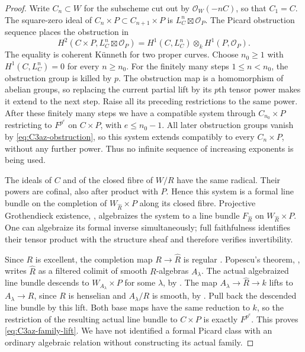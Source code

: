 \begin{proof}
Write $C_n\subset W$ for the subscheme cut out by
$\mathcal O_W(-nC)$, so that $C_1=C$. The square-zero ideal of
$C_n\times P\subset C_{n+1}\times P$ is
$L_C^n\boxtimes\mathcal O_P$. The Picard obstruction sequence
\citep[Lemma 37.4.1]{frC3azStacksPicThickening}
places the obstruction in
\begin{equation}\label{eq:C3az-obstruction}
 H^2(C\times P,L_C^n\boxtimes\mathcal O_P)
      =H^1(C,L_C^n)\otimes_k H^1(P,\mathcal O_P).
\end{equation}
The equality is coherent K\"unneth for two proper curves. Choose
$n_0\ge1$ with $H^1(C,L_C^n)=0$ for every $n\ge n_0$.
For the finitely many steps $1\le n<n_0$, the obstruction group
is killed by $p$. The obstruction map is a homomorphism of abelian
groups, so replacing the current partial lift by its $p$th tensor
power makes it extend to the next step. Raise all its preceding
restrictions to the same power. After these finitely many steps
we have a compatible system through $C_{n_0}\times P$ restricting
to $F^{p^e}$ on $C\times P$, with $e\le n_0-1$.
All later obstruction groups vanish by \eqref{eq:C3az-obstruction},
so this system extends compatibly to every $C_n\times P$, without
any further power. Thus no infinite sequence of increasing exponents
is being used.

The ideals of $C$ and of the closed fibre of $W/R$ have the same
radical. Their powers are cofinal, also after product with $P$.
Hence this system is a formal line bundle on the completion of
$W_{\widehat R}\times P$ along its closed fibre. Projective
Grothendieck existence,
\citet[Lemma 30.24.3]{frC3azStacksExistence}, algebraizes the system
to a line bundle $F_{\widehat R}$ on $W_{\widehat R}\times P$.
One can algebraize its formal inverse simultaneously; full
faithfulness identifies their tensor product with the structure
sheaf and therefore verifies invertibility.

Since $R$ is excellent, the completion map $R\to\widehat R$ is
regular \citep[Lemma 15.51.14]{frC3azStacksCompletion}. Popescu's theorem,
\citet[Theorem 16.12.1]{frC3azStacksPopescu}, writes $\widehat R$
as a filtered colimit of smooth $R$-algebras $A_\lambda$.
The actual algebraized line bundle descends to
$W_{A_\lambda}\times P$ for some $\lambda$, by
\citet[Lemma 32.10.3(2)]{frC3azStacksLimitBundles}.
The map $A_\lambda\to\widehat R\to k$ lifts to
$A_\lambda\to R$, since $R$ is henselian and $A_\lambda/R$ is
smooth, by \citet[Lemma 15.13.3]{frC3azStacksHenselSmooth}.
Pull back the descended line bundle by this lift. Both base maps
have the same reduction to $k$, so the restriction of the resulting
actual line bundle to $C\times P$ is exactly $F^{p^e}$.
This proves \eqref{eq:C3az-family-lift}. We have not identified a
formal Picard class with an ordinary algebraic relation without
constructing its actual family.


\end{proof}

